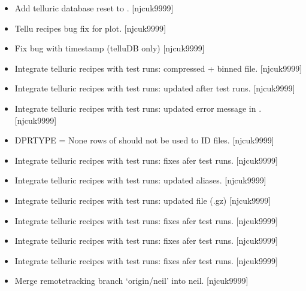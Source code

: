 \documentclass[a4paper,10pt,english]{report}
\begin{document}
\label{\detokenize{misc/changelog:id406}}\begin{itemize}
\item {} 
Add telluric database reset to . {[}njcuk9999{]}

\item {} 
Tellu recipes \sphinxhyphen{} bug fix for plot. {[}njcuk9999{]}

\item {} 
Fix bug with timestamp (telluDB only) {[}njcuk9999{]}

\item {} 
Integrate telluric recipes with test runs: compressed + binned
 file. {[}njcuk9999{]}

\item {} 
Integrate telluric recipes with test runs: updated after test runs.
{[}njcuk9999{]}

\item {} 
Integrate telluric recipes with test runs: updated error message in
. {[}njcuk9999{]}

\item {} 
 \sphinxhyphen{} DPRTYPE = None  rows of  should not be
used to ID files. {[}njcuk9999{]}

\item {} 
Integrate telluric recipes with test runs: fixes afer test runs.
{[}njcuk9999{]}

\item {} 
Integrate telluric recipes with test runs: updated aliases.
{[}njcuk9999{]}

\item {} 
Integrate telluric recipes with test runs: updated  file
(.gz) {[}njcuk9999{]}

\item {} 
Integrate telluric recipes with test runs: fixes afer test runs.
{[}njcuk9999{]}

\item {} 
Integrate telluric recipes with test runs: fixes afer test runs.
{[}njcuk9999{]}

\item {} 
Integrate telluric recipes with test runs: fixes afer test runs.
{[}njcuk9999{]}

\item {} 
Merge remote\sphinxhyphen{}tracking branch ‘origin/neil’ into neil. {[}njcuk9999{]}

\end{itemize}
\end{document}
